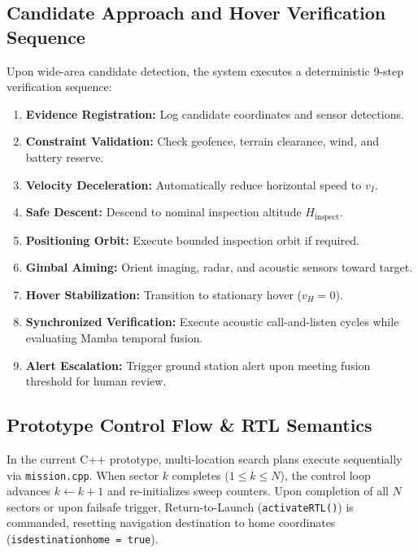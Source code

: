 \subsection{Candidate Approach and Hover Verification Sequence}
Upon wide-area candidate detection, the system executes a deterministic 9-step verification sequence:
\begin{enumerate}
    \item \textbf{Evidence Registration:} Log candidate coordinates and sensor detections.
    \item \textbf{Constraint Validation:} Check geofence, terrain clearance, wind, and battery reserve.
    \item \textbf{Velocity Deceleration:} Automatically reduce horizontal speed to $v_I$.
    \item \textbf{Safe Descent:} Descend to nominal inspection altitude $H_{\mathrm{inspect}}$.
    \item \textbf{Positioning Orbit:} Execute bounded inspection orbit if required.
    \item \textbf{Gimbal Aiming:} Orient imaging, radar, and acoustic sensors toward target.
    \item \textbf{Hover Stabilization:} Transition to stationary hover ($v_H = 0$).
    \item \textbf{Synchronized Verification:} Execute acoustic call-and-listen cycles while evaluating Mamba temporal fusion.
    \item \textbf{Alert Escalation:} Trigger ground station alert upon meeting fusion threshold for human review.
\end{enumerate}

\subsection{Prototype Control Flow \& RTL Semantics}
In the current C++ prototype, multi-location search plans execute sequentially via \texttt{mission.cpp}. When sector $k$ completes ($1 \le k \le N$), the control loop advances $k \leftarrow k+1$ and re-initializes sweep counters. Upon completion of all $N$ sectors or upon failsafe trigger, Return-to-Launch (\texttt{activateRTL()}) is commanded, resetting navigation destination to home coordinates (\texttt{isdestinationhome = true}).
